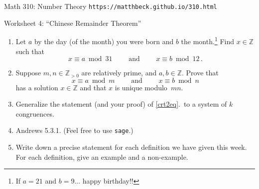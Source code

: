 \documentclass[11pt]{article}
\def\Z{\mathbb{Z}}
\def\sage{{\tt sage}}
\begin{document}
\setlength{\parindent}{0pt}
\setlength{\parskip}{0.2cm}

{ Math 310: Number Theory} \hfill {\tt https://matthbeck.github.io/310.html}

\vspace{.3in}

\begin{center}
\Large{Worksheet 4: ``Chinese Remainder Theorem''}
\end{center}

\begin{enumerate}

\item Let $a$ by the day (of the month) you were born and $b$ the month.\footnote{
If $a = 21$ and $b = 9$... happy birthday!!
}
Find $x \in \Z$ such that
\[
  x \equiv a \bmod 31
  \qquad \text{ and } \qquad
  x \equiv b \bmod 12 \, .
\]

\item\label{crt2eq}
Suppose $m, n \in \Z_{ >0 }$ are relatively prime, and $a, b \in \Z$.
Prove that
\[
  x \equiv a \bmod m
  \qquad \text{ and } \qquad
  x \equiv b \bmod n 
\]
has a solution $x \in \Z$ and that $x$ is unique modulo~$mn$.

\item Generalize the statement (and your proof) of \ref{crt2eq}.\ to a system of $k$ congruences.

\item Andrews 5.3.1. (Feel free to use \sage.)

\item Write down a precise statement for each definition we have given this week.
For each definition, give an example and a non-example.

\end{enumerate}
\end{document}
